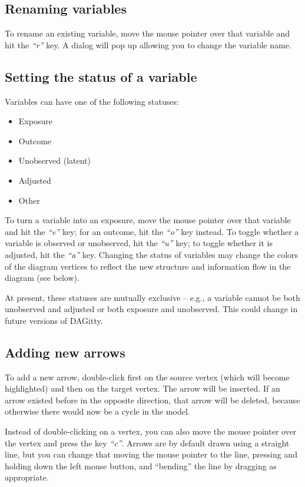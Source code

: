\documentclass[a4paper]{article} %
\newcommand{\pp}{{\sc DAG}itty\xspace}
\newcommand{\action}[1]{\emph{``#1''}}
\begin{document}
\subsection{Renaming variables}

To rename an existing variable, move the
mouse pointer over that variable and hit the \action{r} key. A dialog
will pop up allowing you to change the variable name.

\subsection{Setting the status of a variable}

Variables can have one of the following 
statuses:

\begin{itemize} 
\item Exposure
\item Outcome
\item Unobserved (latent)
\item Adjusted
\item Other
\end{itemize}


To turn a variable into an exposure, move the
mouse pointer over that variable and hit the \action{e} key; 
for an outcome, hit the \action{o} key instead.
To toggle whether a variable is observed or unobserved,
hit the \action{u} key; to toggle whether it is 
adjusted, hit the \action{a} key.
Changing the status of variables may change the 
colors of the diagram vertices to reflect the new structure 
and information flow in the diagram (see below). 

At present, these statuses are mutually exclusive --  e.g.,
a variable cannot be both unobserved and adjusted 
or both exposure and unobserved. This could change
in future versions of \pp.

\subsection{Adding new arrows}

To add a new arrow, double-click first on the source vertex 
(which will become highlighted) and then on the target vertex.
The arrow will be inserted. If an arrow existed before
in the opposite direction, that arrow will be deleted, because otherwise
there would now be a cycle in the model. 

Instead of double-clicking on a vertex, you can also move the mouse pointer
over the vertex and press the key \action{c}. Arrows are by default
drawn using a straight line,
but you can change that moving the mouse pointer to the line,
pressing and holding down the left mouse button, and ``bending''
the line by dragging as appropriate.
\end{document}
